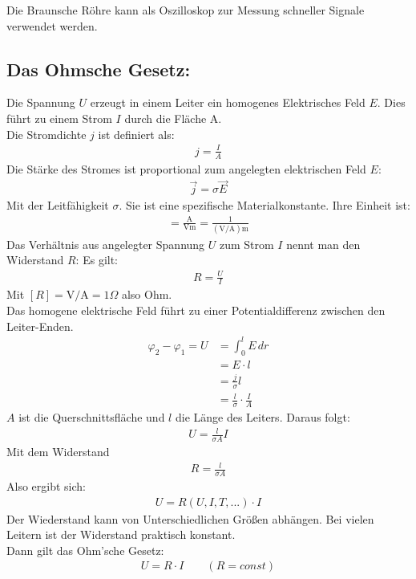 \documentclass{scrartcl}
\begin{document}
\vspace{0.5cm}
\noindent Die Braunsche Röhre kann als Oszilloskop zur Messung schneller Signale verwendet werden.

\subsection{Das Ohmsche Gesetz:}
Die Spannung $U$ erzeugt in einem Leiter ein homogenes Elektrisches Feld $E$.
Dies führt zu einem Strom $I$ durch die Fläche A.\\
Die Stromdichte $j$ ist definiert als:
\begin{align}
    j=\frac{I}{A}
\end{align}
Die Stärke des Stromes ist proportional zum angelegten elektrischen Feld $E$:
\begin{align}
    \vec{j}=\sigma \vec{E}
\end{align}
Mit der Leitfähigkeit $\sigma$. Sie ist eine spezifische Materialkonstante. Ihre Einheit ist:
\begin{align}
    [\sigma]=\frac{\mathrm{A}}{\mathrm{Vm}}=\frac{1}{\mathrm{(V/A)m}}
\end{align}
Das Verhältnis aus angelegter Spannung $U$ zum Strom $I$ nennt man den Widerstand $R$:
Es gilt:
\begin{align}
    R=\frac{U}{I}
\end{align}
Mit $[R]=\mathrm{V/A}=1\Omega$ also Ohm.\\

\noindent Das homogene elektrische Feld führt zu einer Potentialdifferenz zwischen den Leiter-Enden.
\begin{align}
    \varphi_2-\varphi_1=U&=\int_{0}^{l}E\, dr\\
    &=E\cdot l\\
    &=\frac{j}{\sigma}l\\
    &=\frac{l}{\sigma}\cdot \frac{I}{A}
\end{align}
$A$ ist die Querschnittsfläche und $l$ die Länge des Leiters. Daraus folgt:
\begin{align}
    U=\frac{l}{\sigma A}I
\end{align}
Mit dem Widerstand
\begin{align}
    R=\frac{l}{\sigma A}
\end{align}
Also ergibt sich:
\begin{align}
    U=R(U,I,T,...)\cdot I
\end{align}
Der Wiederstand kann von Unterschiedlichen Größen abhängen.
Bei vielen Leitern ist der Widerstand praktisch konstant.\\
Dann gilt das Ohm'sche Gesetz:
\begin{align}
    \boxed{U=R\cdot I}\qquad (R=const)
\end{align}
\end{document}
